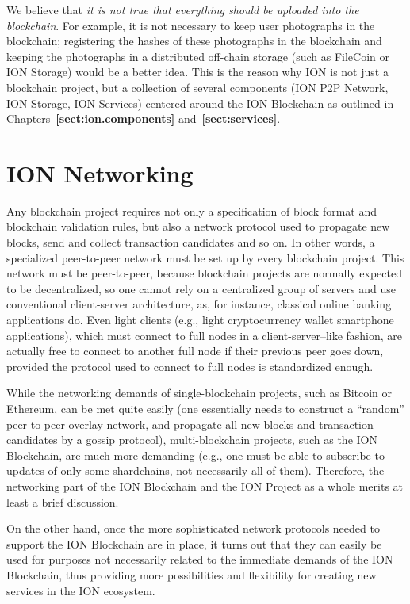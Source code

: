 \documentclass[12pt,oneside]{article}
\def\refpoint#1{{\rm\textbf{\ref{#1}}}}
\let\ptref=\refpoint
\def\mysection#1{\section{#1}\fancyhead[C]{\textsc{Chapter \textbf{\thesection.} #1}}}
\begin{document}
We believe that {\em it is not true that everything should be uploaded
  into the blockchain}. For example, it is not necessary to keep user
photographs in the blockchain; registering the hashes of these
photographs in the blockchain and keeping the photographs in a
distributed off-chain storage (such as FileCoin or ION Storage) would
be a better idea. This is the reason why ION is not just a blockchain
project, but a collection of several components (ION P2P Network, ION
Storage, ION Services) centered around the ION Blockchain as outlined
in Chapters~\ptref{sect:ion.components} and~\ptref{sect:services}.

%
%
%
%

\clearpage
\mysection{ION Networking}\label{sect:network}

Any blockchain project requires not only a specification of block
format and blockchain validation rules, but also a network protocol
used to propagate new blocks, send and collect transaction candidates
and so on. In other words, a specialized peer-to-peer network must be
set up by every blockchain project. This network must be peer-to-peer,
because blockchain projects are normally expected to be decentralized,
so one cannot rely on a centralized group of servers and use
conventional client-server architecture, as, for instance, classical
online banking applications do. Even light clients (e.g., light
cryptocurrency wallet smartphone applications), which must connect to
full nodes in a client-server--like fashion, are actually free to
connect to another full node if their previous peer goes down,
provided the protocol used to connect to full nodes is standardized
enough.

While the networking demands of single-blockchain projects, such as
Bitcoin or Ethereum, can be met quite easily (one essentially needs to
construct a ``random'' peer-to-peer overlay network, and propagate all
new blocks and transaction candidates by a gossip protocol),
multi-blockchain projects, such as the ION Blockchain, are much more
demanding (e.g., one must be able to subscribe to updates of only some
shardchains, not necessarily all of them). Therefore, the networking
part of the ION Blockchain and the ION Project as a whole merits at
least a brief discussion.

On the other hand, once the more sophisticated network protocols
needed to support the ION Blockchain are in place, it turns out that
they can easily be used for purposes not necessarily related to the
immediate demands of the ION Blockchain, thus providing more
possibilities and flexibility for creating new services in the ION
ecosystem.
\end{document}
